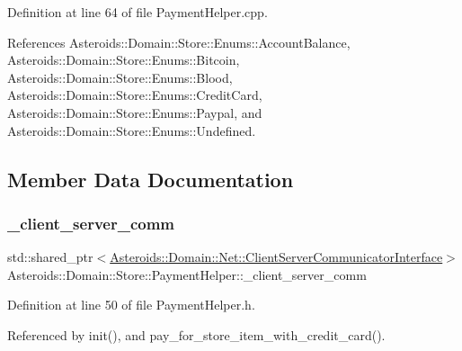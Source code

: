 Definition at line 64 of file Payment\+Helper.\+cpp.



References Asteroids\+::\+Domain\+::\+Store\+::\+Enums\+::\+Account\+Balance, Asteroids\+::\+Domain\+::\+Store\+::\+Enums\+::\+Bitcoin, Asteroids\+::\+Domain\+::\+Store\+::\+Enums\+::\+Blood, Asteroids\+::\+Domain\+::\+Store\+::\+Enums\+::\+Credit\+Card, Asteroids\+::\+Domain\+::\+Store\+::\+Enums\+::\+Paypal, and Asteroids\+::\+Domain\+::\+Store\+::\+Enums\+::\+Undefined.



\subsection{Member Data Documentation}
\mbox{\label{classAsteroids_1_1Domain_1_1Store_1_1PaymentHelper_aada704df6830a51f1f40f5785730a5f3}} 
\subsubsection{\texorpdfstring{\+\_\+client\+\_\+server\+\_\+comm}{\_client\_server\_comm}}
{\footnotesize\ttfamily std\+::shared\+\_\+ptr$<$\hyperlink{classAsteroids_1_1Domain_1_1Net_1_1ClientServerCommunicatorInterface}{Asteroids\+::\+Domain\+::\+Net\+::\+Client\+Server\+Communicator\+Interface}$>$ Asteroids\+::\+Domain\+::\+Store\+::\+Payment\+Helper\+::\+\_\+client\+\_\+server\+\_\+comm\hspace{0.3cm}{\ttfamily [private]}}



Definition at line 50 of file Payment\+Helper.\+h.



Referenced by init(), and pay\+\_\+for\+\_\+store\+\_\+item\+\_\+with\+\_\+credit\+\_\+card().

\mbox{\label{classAsteroids_1_1Domain_1_1Store_1_1PaymentHelper_aa4aea2ad9b1de1b304bf8d3a08c15b4a}} 
